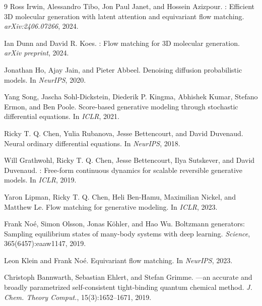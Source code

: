 \documentclass{article}
\begin{document}
\begin{thebibliography}{9}
Ross Irwin, Alessandro Tibo, Jon Paul Janet, and Hossein Azizpour.
: Efficient {3D} molecular generation with latent attention and equivariant flow matching.
\newblock \emph{arXiv:2406.07266}, 2024.

Ian Dunn and David R. Koes.
: Flow matching for {3D} molecular generation.
\newblock \emph{arXiv preprint}, 2024.

Jonathan Ho, Ajay Jain, and Pieter Abbeel.
\newblock Denoising diffusion probabilistic models.
\newblock In \emph{NeurIPS}, 2020.

Yang Song, Jascha Sohl-Dickstein, Diederik P. Kingma, Abhishek Kumar, Stefano Ermon, and Ben Poole.
\newblock Score-based generative modeling through stochastic differential equations.
\newblock In \emph{ICLR}, 2021.

Ricky T. Q. Chen, Yulia Rubanova, Jesse Bettencourt, and David Duvenaud.
\newblock Neural ordinary differential equations.
\newblock In \emph{NeurIPS}, 2018.

Will Grathwohl, Ricky T. Q. Chen, Jesse Bettencourt, Ilya Sutskever, and David Duvenaud.
: Free-form continuous dynamics for scalable reversible generative models.
\newblock In \emph{ICLR}, 2019.

Yaron Lipman, Ricky T. Q. Chen, Heli Ben-Hamu, Maximilian Nickel, and Matthew Le.
\newblock Flow matching for generative modeling.
\newblock In \emph{ICLR}, 2023.

Frank No{\'e}, Simon Olsson, Jonas K\"ohler, and Hao Wu.
\newblock Boltzmann generators: Sampling equilibrium states of many-body systems with deep learning.
\newblock \emph{Science}, 365(6457):eaaw1147, 2019.

Leon Klein and Frank No{\'e}.
\newblock Equivariant flow matching.
\newblock In \emph{NeurIPS}, 2023.

Christoph Bannwarth, Sebastian Ehlert, and Stefan Grimme.
---an accurate and broadly parametrized self-consistent tight-binding quantum chemical method.
\newblock \emph{J. Chem. Theory Comput.}, 15(3):1652--1671, 2019.


\end{thebibliography}
\end{document}
